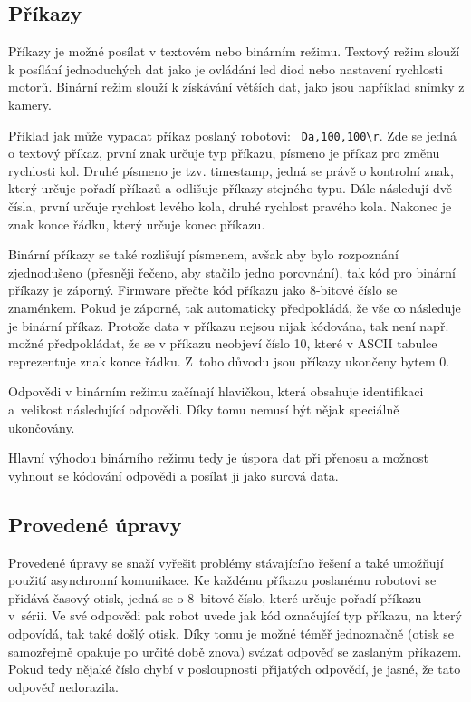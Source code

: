     \subsection{Příkazy}
    \label{btcom:prikazy}

    Příkazy je možné posílat v textovém nebo binárním režimu. Textový režim
    slouží k posílání jednoduchých dat jako je ovládání led diod nebo nastavení
    rychlosti motorů. Binární režim slouží k získávání větších dat, jako jsou
    například snímky z kamery.

    Příklad jak může vypadat příkaz poslaný robotovi: {\tt
    Da,100,100\textbackslash r}. Zde se jedná o textový příkaz, první znak
    určuje typ příkazu, písmeno  je příkaz pro změnu rychlosti kol. Druhé
    písmeno je tzv. timestamp, jedná se právě o kontrolní znak, který určuje
    pořadí příkazů a odlišuje příkazy stejného typu. Dále následují dvě čísla,
    první určuje rychlost levého kola, druhé rychlost pravého kola. Nakonec je
    znak konce řádku, který určuje konec příkazu.

    Binární příkazy se také rozlišují písmenem, avšak aby bylo rozpoznání
    zjednodušeno (přesněji řečeno, aby stačilo jedno porovnání), tak kód pro
    binární příkazy je záporný. Firmware přečte kód příkazu jako 8-bitové
    číslo se znaménkem. Pokud je záporné, tak automaticky předpokládá, že vše
    co následuje je binární příkaz. Protože data v příkazu nejsou nijak
    kódována, tak není např. možné předpokládat, že se v příkazu neobjeví číslo
    10, které v ASCII tabulce reprezentuje znak konce řádku. Z~toho důvodu jsou
    příkazy ukončeny bytem 0.

    Odpovědi v binárním režimu začínají hlavičkou, která obsahuje identifikaci
    a~velikost následující odpovědi. Díky tomu nemusí být nějak speciálně
    ukončovány.

    Hlavní výhodou binárního režimu tedy je úspora dat při přenosu a možnost
    vyhnout se kódování odpovědi a posílat ji jako surová data.

    \subsection{Provedené úpravy}
    \label{btcom:upravy}

    Provedené úpravy se snaží vyřešit problémy stávajícího řešení a také
    umožňují použití asynchronní komunikace. Ke každému příkazu poslanému
    robotovi se přidává časový otisk, jedná se o 8--bitové číslo, které určuje
    pořadí příkazu v~sérii. Ve své odpovědi pak robot uvede jak kód označující
    typ příkazu, na který odpovídá, tak také došlý otisk. Díky tomu je možné
    téměř jednoznačně (otisk se samozřejmě opakuje po určité době znova) svázat
    odpověď se zaslaným příkazem. Pokud tedy nějaké číslo chybí v posloupnosti
    přijatých odpovědí, je jasné, že tato odpověď nedorazila.

